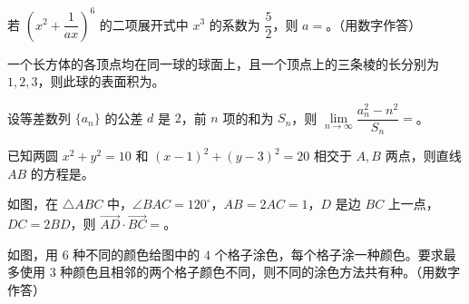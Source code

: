 \begin{question}
若 $\left(x^2+\dfrac{1}{ax}\right)^6$ 的二项展开式中 $x^3$ 的系数为 $\dfrac{5}{2}$，则 $a=$\gkblank{}。（用数字作答）

\end{question}
\begin{question}
一个长方体的各顶点均在同一球的球面上，且一个顶点上的三条棱的长分别为 $1,2,3$，则此球的表面积为\gkblank{}。

\end{question}
\begin{question}
设等差数列 $\{a_n\}$ 的公差 $d$ 是 $2$，前 $n$ 项的和为 $S_n$，则 $\lim\limits_{n\to\infty}\dfrac{a_n^2-n^2}{S_n}=$\gkblank{}。

\end{question}
\begin{question}
已知两圆 $x^2+y^2=10$ 和 $(x-1)^2+(y-3)^2=20$ 相交于 $A,B$ 两点，则直线 $AB$ 的方程是\gkblank{}。

\Needspace{0.4\textheight}
\end{question}
\begin{question}
如图，在 $\triangle ABC$ 中，$\angle BAC=120^\circ$，$AB=2AC=1$，$D$ 是边 $BC$ 上一点，$DC=2BD$，则 $\overrightarrow{AD}\cdot\overrightarrow{BC}=$\gkblank{}。
\nopagebreak[4]
\begin{center}\end{center}
\nopagebreak[4]
\Needspace{0.4\textheight}
\end{question}
\begin{question}
如图，用 $6$ 种不同的颜色给图中的 $4$ 个格子涂色，每个格子涂一种颜色。要求最多使用 $3$ 种颜色且相邻的两个格子颜色不同，则不同的涂色方法共有\gkblank{}种。（用数字作答）
\nopagebreak[4]
\begin{center}\end{center}
\nopagebreak[4]
\end{question}

